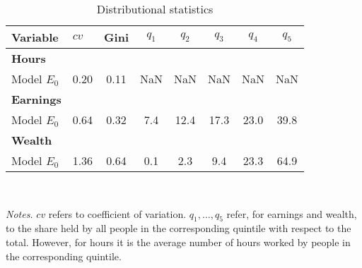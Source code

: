 \begin{table}[!htbp]
\centering
\caption{Distributional statistics}
\begin{tabular}{llcccccc}
\toprule
Variable & $cv$ & Gini & $q_1$ & $q_2$ & $q_3$ & $q_4$ & $q_5$ \\
\midrule
\textbf{Hours} &   &  &   &  &  &  &  \\
Model $E_0$ & 0.20 & 0.11 & NaN & NaN & NaN & NaN & NaN \\
\addlinespace
\textbf{Earnings} &   &  &   &  &  &  &  \\
Model $E_0$ & 0.64 & 0.32 & 7.4 & 12.4 & 17.3 & 23.0 & 39.8 \\
\addlinespace
\textbf{Wealth} &   &  &   &  &  &  &  \\
Model $E_0$ & 1.36 & 0.64 & 0.1 & 2.3 & 9.4 & 23.3 & 64.9 \\
\bottomrule
\end{tabular}
\\[3ex]
\raggedright\footnotesize{\textit{Notes.} $cv$ refers to coefficient of variation. $q_1, \dots, q_5$ refer, for earnings and wealth, to the share held by all people in the corresponding quintile with respect to the total. However, for hours it is the average number of hours worked by people in the corresponding quintile.}\\
\normalsize
\end{table}
